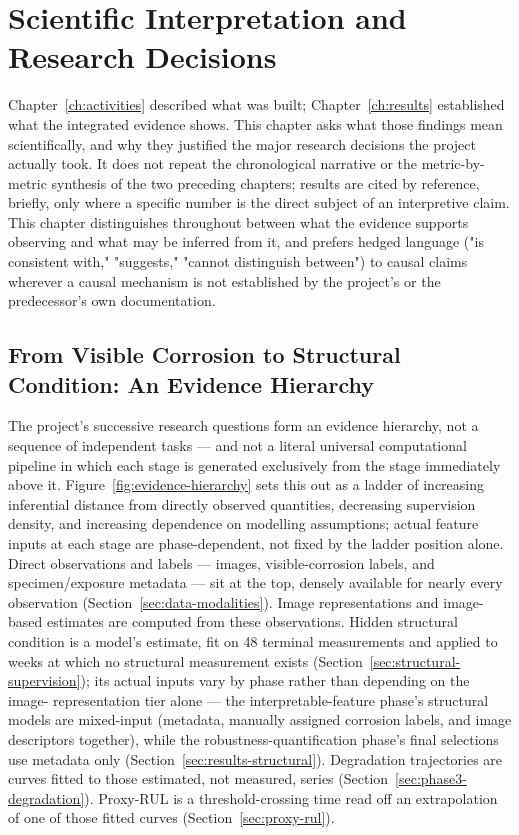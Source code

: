 \chapter{Scientific Interpretation and Research Decisions}
\label{ch:interpretation}

Chapter~\ref{ch:activities} described what was built; Chapter~\ref{ch:results}
established what the integrated evidence shows. This chapter asks what
those findings mean scientifically, and why they justified the major
research decisions the project actually took. It does not repeat the
chronological narrative or the metric-by-metric synthesis of the two
preceding chapters; results are cited by reference, briefly, only where a
specific number is the direct subject of an interpretive claim. This
chapter distinguishes throughout between what the evidence supports
observing and what may be inferred from it, and prefers hedged language
("is consistent with," "suggests," "cannot distinguish between") to
causal claims wherever a causal mechanism is not established by the
project's or the predecessor's own documentation.

\section{From Visible Corrosion to Structural Condition: An Evidence Hierarchy}
\label{sec:interp-hierarchy}

The project's successive research questions form an evidence hierarchy,
not a sequence of independent tasks — and not a literal universal
computational pipeline in which each stage is generated exclusively from
the stage immediately above it. Figure~\ref{fig:evidence-hierarchy} sets
this out as a ladder of increasing inferential distance from directly
observed quantities, decreasing supervision density, and increasing
dependence on modelling assumptions; actual feature inputs at each stage
are phase-dependent, not fixed by the ladder position alone. Direct
observations and labels — images, visible-corrosion labels, and
specimen/exposure metadata — sit at the top, densely available for nearly
every observation (Section~\ref{sec:data-modalities}). Image
representations and image-based estimates are computed from these
observations. Hidden structural condition is a model's estimate, fit on 48
terminal measurements and applied to weeks at which no structural
measurement exists (Section~\ref{sec:structural-supervision}); its actual
inputs vary by phase rather than depending on the image-
representation tier alone — the interpretable-feature phase's structural
models are mixed-input (metadata, manually assigned corrosion labels, and
image descriptors together), while the robustness-quantification phase's
final selections use metadata only (Section~\ref{sec:results-structural}).
Degradation trajectories are curves fitted to those estimated, not
measured, series (Section~\ref{sec:phase3-degradation}). Proxy-RUL is a
threshold-crossing time read off an extrapolation of one of those fitted
curves (Section~\ref{sec:proxy-rul}).

